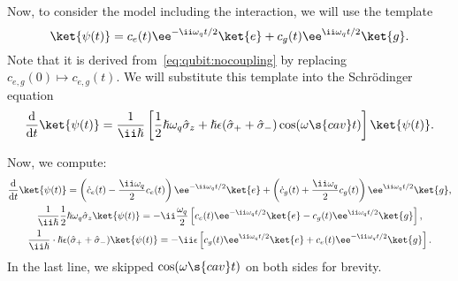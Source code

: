\documentclass[fontsize=9pt,bookmarkpackage=false]{scrartcl}
\renewcommand{\hbar}{\hslash}
\begin{document}
Now, to consider the model including the interaction, we will use the template
\begin{equation}
  \ket{ \psi (t) }
  =
  c_e (t) \ee^{ - \ii \omega_q t / 2 } \ket{ e }
  +
  c_g (t) \ee^{ \ii \omega_q t / 2 } \ket{ g }.
\end{equation}
Note that it is derived from~\cref{eq:qubit:nocoupling} by replacing $c_{e,g } (0) \mapsto c_{e,g } (t)$.
We will substitute this template into the Schrödinger equation
\begin{equation}
  \diff{}{ t} \ket{ \psi(t) }
  = \frac{ 1 }{ \ii \hbar }
  \left[
    \frac 12 \hbar \omega_q \hat \sigma_z
    +
    \hbar \epsilon ( \hat \sigma_+ + \hat \sigma_- )
    \cos ( \omega\s{cav} t )
  \right]
  \ket{ \psi (t) }.
\end{equation}

Now, we compute:
\begin{gather}
  \label{eq:rabi:lhs}
  \diff{}{ t } \ket{ \psi (t) }
  =
  \left( \dot c_e (t) - \frac{ \ii \omega_q  }{ 2 } c_e (t) \right) \ee^{ - \ii \omega_ q t / 2 } \ket{ e }
  +
  \left( \dot c_g (t) + \frac{\ii \omega_q}{2} c_g (t)\right) \ee^{ \ii \omega_ q t / 2 } \ket{ g },
  \\
  \label{eq:rabi:own}
  \frac{ 1 }{ \ii \hbar } \frac 12 \hbar \omega_q \hat \sigma_z \ket{ \psi (t) }
  = - \ii \frac{ \omega_ q }{ 2 }
  \left[
    c_e (t) \ee^ { - \ii \omega_q t / 2 }  \ket{ e }
    - c_g (t ) \ee^ { \ii \omega_q t / 2 } \ket { g }
  \right],
  \\
  \frac{ 1 }{ \ii \hbar } \cdot \hbar \epsilon ( \hat \sigma_+ + \hat \sigma_- )
  \ket{ \psi (t) }
  =
  - \ii \epsilon
  \left[
  c_g (t) \ee^{ \ii \omega_q t / 2 } \ket{ e }
  +
  c_e (t) \ee^{ - \ii \omega_q t / 2 } \ket{ g }
  \right].
\end{gather}
In the last line, we skipped $\cos( \omega\s{cav} t )$ on both sides for brevity.
\end{document}
